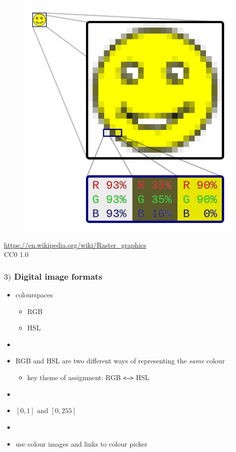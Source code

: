 \documentclass[english,14pt]{beamer}
\begin{document}

\begin{frame}[fragile]

\frametitle{}

\vspace*{-5mm}
\begin{figure}[ht]
	\centering
	\includegraphics[width=.6\textwidth]{figures/smiley}
\end{figure}
\vspace*{-5mm}
{\footnotesize
\href{https://en.wikipedia.org/wiki/Raster_graphics}{https://en.wikipedia.org/wiki/Raster\_graphics} \\
\vspace*{-1mm}
CC0 1.0}

\end{frame}


\begin{frame}[fragile]

\frametitle{$3)$ Digital image formats}

\begin{itemize}

	\item colourspaces
	\begin{itemize}
		\item RGB
		\item HSL
	\end{itemize}
	\item[]
	\item RGB and HSL are two different ways of representing the \emph{same} colour
	\begin{itemize}
		\item key theme of assignment: RGB \texttt{<-->} HSL
	\end{itemize}
	\item[]
	\item $[0,1]$ and $[0,255]$
	\item[]
	\item use colour images and links to colour picker
\end{itemize}

\end{frame}
\end{document}
